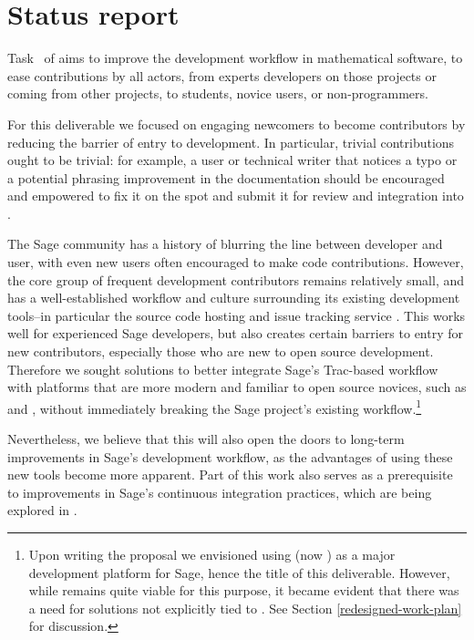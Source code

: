 \hypertarget{status-report}{%
\section{Status report}\label{status-report}}

Task~ of
 aims to improve the development workflow in
mathematical software, to ease contributions by all actors, from experts
developers on those projects or coming from other projects, to students, novice
users, or non-programmers.

For this deliverable we focused on engaging newcomers to become contributors by
reducing the barrier of entry to \Sage development. In particular, trivial
contributions ought to be trivial: for example, a user or technical writer that
notices a typo or a potential phrasing improvement in the documentation should
be encouraged and empowered to fix it on the spot and submit it for review and
integration into \Sage.

The Sage community has a history of blurring the line between developer and
user, with even new users often encouraged to make code contributions.
However, the core group of frequent development contributors remains relatively
small, and has a well-established workflow and culture surrounding its existing
development tools--in particular the source code hosting and issue tracking
service \Trac.  This works well for experienced Sage developers, but also
creates certain barriers to entry for new contributors, especially those who
are new to open source development.  Therefore we sought solutions to better
integrate Sage's Trac-based workflow with platforms that are more modern and
familiar to open source novices, such as \GitHub and \GitLab, without
immediately breaking the Sage project's existing workflow.\footnote{Upon
writing the proposal we envisioned using \SMC (now \cocalc) as a major
development platform for Sage, hence the title of this deliverable.  However,
while \cocalc remains quite viable for this purpose, it became evident that
there was a need for solutions not explicitly tied to \cocalc.  See Section
\ref{redesigned-work-plan} for discussion.}

Nevertheless, we believe that this will also open the doors to long-term
improvements in Sage's development workflow, as the advantages of using these
new tools become more apparent.  Part of this work also serves as a
prerequisite to improvements in Sage's continuous integration practices, which
are being explored in
.

